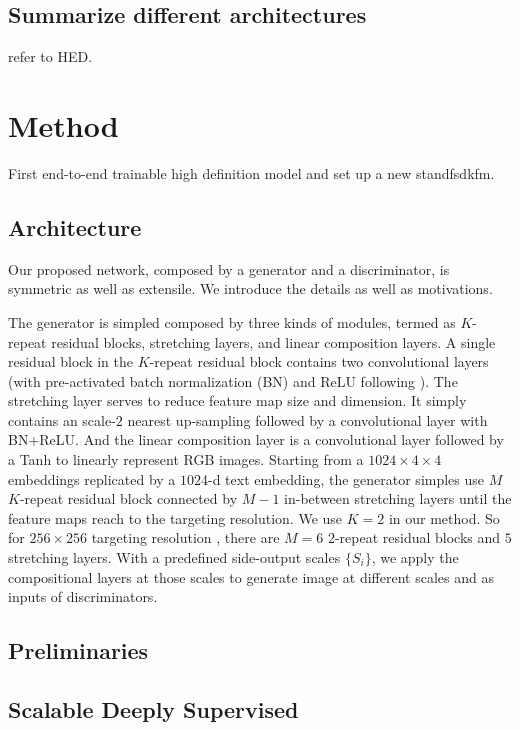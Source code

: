 \documentclass[10pt,twocolumn,letterpaper]{article}
\begin{document}
\subsection{Summarize different architectures}
refer to HED.

\section{Method}
First end-to-end trainable high definition model and set up a new standfsdkfm.

\subsection{Architecture}
Our proposed network, composed by a generator and a discriminator, is symmetric as well as extensile. We introduce the details as well as motivations.

The generator is simpled composed by three kinds of modules, termed as $K$-repeat residual blocks, stretching layers, and linear composition layers.
A single residual block in the $K$-repeat residual block contains two convolutional layers (with pre-activated batch normalization (BN) \cite{} and ReLU following \cite{he2016identity}). The stretching  layer serves to reduce feature map size and dimension. It simply contains an scale-$2$ nearest up-sampling followed by a convolutional layer with BN+ReLU.  And the linear composition layer is a convolutional layer followed by a Tanh to linearly represent RGB images.
Starting from a $1024{\times}4{\times}4$ embeddings replicated by a $1024$-d text embedding, the generator simples use $M$ $K$-repeat residual block connected by $M-1$ in-between stretching layers until the feature maps reach to the targeting resolution. We use $K{=}2$ in our method. So for $256{\times}256$ targeting resolution , there are $M{=}6$ $2$-repeat residual blocks and $5$ stretching layers. With a predefined side-output scales $\{S_i\}$, we apply the compositional layers at those scales to generate image at different scales and as inputs of discriminators. 

\subsection{Preliminaries}

\subsection{Scalable Deeply Supervised}
\end{document}
